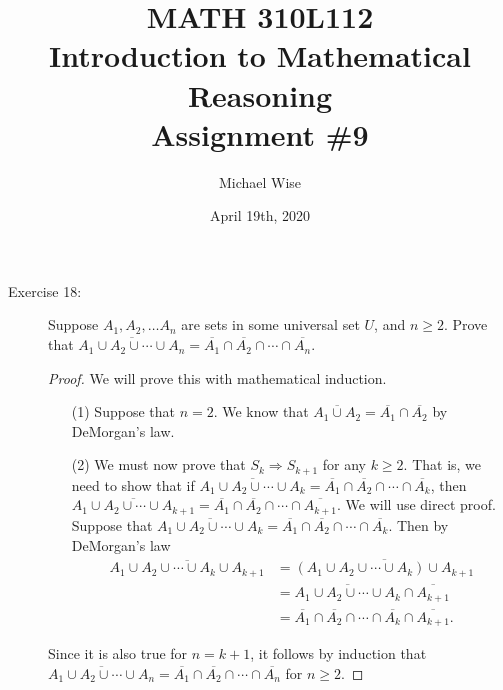 \documentclass[12pt]{article}
\title{MATH 310L112\\
       Introduction to Mathematical Reasoning\\
       Assignment \#9}
\author{Michael Wise}
\date{April 19th, 2020}
\begin{document}
\maketitle
\begin{description}
\item[Exercise 18:] Suppose $A_1, A_2, \ldots A_n$ are sets in some universal set $U$, and $n \geq 2$. Prove that $\overline{A_1 \cup A_2 \cup \cdots \cup A_n} = \overline{A_1} \cap \overline{A_2} \cap \cdots \cap \overline{A_n}$.
\begin{spacing}{2}
\begin{proof}
 We will prove this with mathematical induction. 
\begin{enumerate}
    \item[(1)] Suppose that $n=2$. We know that $\overline{A_1 \cup A_2} = \overline{A_1} \cap \overline{A_2}$ by DeMorgan's law.
    \item[(2)] We must now prove that $S_k \Rightarrow S_{k+1}$ for any $k \geq 2$. That is, we need to show that if $\overline{A_1 \cup A_2 \cup \cdots \cup A_k} = \overline{A_1} \cap \overline{A_2} \cap \cdots \cap \overline{A_k}$, then $\overline{A_1 \cup A_2 \cup \cdots \cup A_{k+1}} = \overline{A_1} \cap \overline{A_2} \cap \cdots \cap \overline{A_{k+1}}$. We will use direct proof. Suppose that $\overline{A_1 \cup A_2 \cup \cdots \cup A_k} = \overline{A_1} \cap \overline{A_2} \cap \cdots \cap \overline{A_k}$. Then by DeMorgan's law
    \begin{align*}
    \overline{A_1 \cup A_2 \cup \cdots \cup A_{k} \cup A_{k+1}} &= \overline{(A_1 \cup A_2 \cup \cdots \cup A_{k}) \cup A_{k+1}} \\
    &= \overline{A_1 \cup A_2 \cup \cdots \cup A_{k}} \cap \overline{A_{k+1}} \\
    &= \overline{A_1} \cap \overline{A_2} \cap \cdots \cap \overline{A_k} \cap \overline{A_{k+1}}.
    \end{align*}
    \end{enumerate}
Since it is also true for $n = k+1$, it follows by induction that $\overline{A_1 \cup A_2 \cup \cdots \cup A_n} = \overline{A_1} \cap \overline{A_2} \cap \cdots \cap \overline{A_n}$ for $n \geq 2$.
\end{proof}


\end{spacing}
\end{description}
\end{document}
